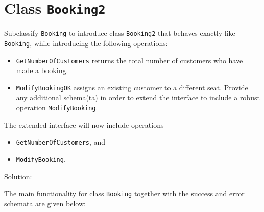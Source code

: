 \documentclass[12pt]{article}
\begin{document}
\section*{Class \texttt{Booking2}}

Subclassify \texttt{Booking} to introduce class \texttt{Booking2} that behaves exactly like \texttt{Booking}, while introducing the following operations:

\begin{itemize}

\item \texttt{GetNumberOfCustomers} returns the total number of customers who have made a booking.

\item \texttt{ModifyBookingOK} assigns an existing customer to a different seat. Provide any additional schema(ta) in order to extend the interface to include a robust operation \texttt{ModifyBooking}.

\end{itemize}

\noindent The extended interface will now include operations

\begin{itemize}

\item \texttt{GetNumberOfCustomers}, and
\item \texttt{ModifyBooking}.

\end{itemize}

\newpage

\noindent \underline{Solution}:

\noindent The main functionality for class \texttt{Booking} together with the success and error schemata are given below:
\end{document}
